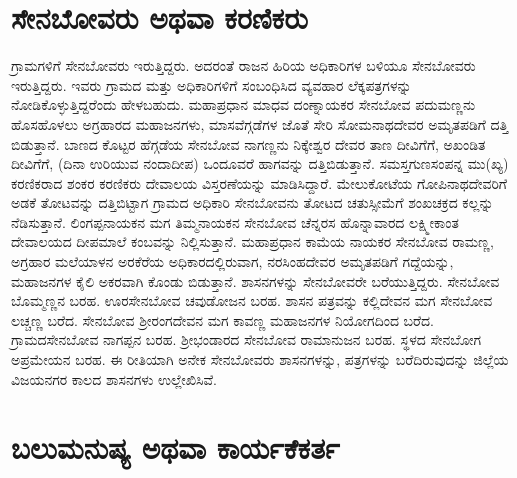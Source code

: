 \section{ಸೇನಬೋವರು ಅಥವಾ ಕರಣಿಕರು}

ಗ್ರಾಮಗಳಿಗೆ ಸೇನಬೋವರು ಇರುತ್ತಿದ್ದರು. ಅದರಂತೆ ರಾಜನ ಹಿರಿಯ ಅಧಿಕಾರಿಗಳ ಬಳಿಯೂ ಸೇನಬೋವರು ಇರುತ್ತಿದ್ದರು. ಇವರು ಗ್ರಾಮದ ಮತ್ತು ಅಧಿಕಾರಿಗಳಿಗೆ ಸಂಬಂಧಿಸಿದ ವ್ಯವಹಾರ ಲೆಕ್ಕಪತ್ರಗಳನ್ನು ನೋಡಿಕೊಳ್ಳುತ್ತಿದ್ದರೆಂದು ಹೇಳಬಹುದು. ಮಹಾಪ್ರಧಾನ ಮಾಧವ ದಂಣ್ನಾಯಕರ ಸೇನಬೋವ ಪದುಮಣ್ಣನು ಹೊಸಹೊಳಲು ಅಗ್ರಹಾರದ ಮಹಾಜನಗಳು, ಮಾಸವೆಗ್ಗಡೆಗಳ ಜೊತೆ ಸೇರಿ ಸೋಮನಾಥದೇವರ ಅಮೃತಪಡಿಗೆ ದತ್ತಿ ಬಿಡುತ್ತಾನೆ. ಬಾಣದ ಕೊಟ್ಟರ ಹೆಗ್ಗಡೆಯ ಸೇನಬೋವ ನಾಗಣ್ಣನು ನಿಕ್ಕೇಶ್ವರ ದೇವರ ತಾಣ ದೀವಿಗೆಗೆ, ಅಖಂಡಿತ ದೀವಿಗೆಗೆ, (ದಿನಾ ಉರಿಯುವ ನಂದಾದೀಪ) ಒಂದೂವರೆ ಹಾಗವನ್ನು ದತ್ತಿಬಿಡುತ್ತಾನೆ. ಸಮಸ್ತಗುಣಸಂಪನ್ನ ಮು(ಖ್ಯ) ಕರಣಿಕರಾದ ಶಂಕರ ಕರಣಿಕರು ದೇವಾಲಯ ವಿಸ್ತರಣೆಯನ್ನು ಮಾಡಿಸಿದ್ದಾರೆ. ಮೇಲುಕೋಟೆಯ ಗೋಪಿನಾಥದೇವರಿಗೆ ಅಡಕೆ ತೋಟವನ್ನು ದತ್ತಿಬಿಟ್ಟಾಗ ಗ್ರಾಮದ ಅಧಿಕಾರಿ ಸೇನಬೋವನು ತೋಟದ ಚತುಸ್ಸೀಮೆಗೆ ಶಂಖಚಕ್ರದ ಕಲ್ಲನ್ನು ನೆಡಿಸುತ್ತಾನೆ. ಲಿಂಗಪ್ಪನಾಯಕನ ಮಗ ತಿಮ್ಮನಾಯಕನ ಸೇನಬೋವ ಚೆನ್ನರಸ ಹೊನ್ನಾವಾರದ ಲಕ್ಷ್ಮೀಕಾಂತ ದೇವಾಲಯದ ದೀಪಮಾಲೆ ಕಂಬವನ್ನು ನಿಲ್ಲಿಸುತ್ತಾನೆ. ಮಹಾಪ್ರಧಾನ ಕಾಮೆಯ ನಾಯಕರ ಸೇನಬೋವ ರಾಮಣ್ಣ, ಅಗ್ರಹಾರ ಮಲೆಯಾಳನ ಅರಕೆರೆಯ ಅಧಿಕಾರದಲ್ಲಿರುವಾಗ, ನರಸಿಂಹದೇವರ ಅಮೃತಪಡಿಗೆ ಗದ್ದೆಯನ್ನು, ಮಹಾಜನಗಳ ಕೈಲಿ ಅಕರವಾಗಿ ಕೊಂಡು ಬಿಡುತ್ತಾನೆ. ಶಾಸನಗಳನ್ನು ಸೇನಬೋವರೇ ಬರೆಯುತ್ತಿದ್ದರು. ಸೇನಬೋವ ಬೊಮ್ಮಣ್ಣನ ಬರಹ. ಊರಸೇನಬೋವ ಚವುಡೋಜನ ಬರಹ. ಶಾಸನ ಪತ್ರವನ್ನು ಕಲ್ಲಿದೇವನ ಮಗ ಸೇನಬೋವ ಲಚ್ಚಣ್ಣ ಬರೆದ. ಸೇನಬೋವ ಶ‍್ರೀರಂಗದೇವನ ಮಗ ಕಾವಣ್ಣ ಮಹಾಜನಗಳ ನಿಯೋಗದಿಂದ ಬರೆದ. ಗ್ರಾಮದಸೇನಬೋವ ನಾಗಪ್ಪನ ಬರಹ. ಶ‍್ರೀಭಂಡಾರದ ಸೇನಬೋವ ರಾಮಾನುಜನ ಬರಹ. ಸ್ಥಳದ ಸೇನಬೋಗ ಅಪ್ರಮೇಯನ ಬರಹ. ಈ ರೀತಿಯಾಗಿ ಅನೇಕ ಸೇನಬೋವರು ಶಾಸನಗಳನ್ನು, ಪತ್ರಗಳನ್ನು ಬರೆದಿರುವುದನ್ನು ಜಿಲ್ಲೆಯ ವಿಜಯನಗರ ಕಾಲದ ಶಾಸನಗಳು ಉಲ್ಲೇಖಿಸಿವೆ.


\section{ಬಲುಮನುಷ್ಯ ಅಥವಾ ಕಾರ್ಯಕೆಕರ್ತ}

